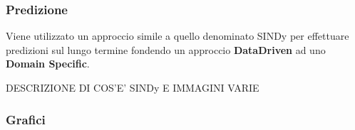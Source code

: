 \subsubsection*{Predizione}
Viene utilizzato un approccio simile a quello denominato SINDy \cite{wiki:Sparse_identification_of_non-linear_dynamics}
per effettuare predizioni sul lungo termine fondendo un approccio \textbf{DataDriven} ad uno
\textbf{Domain Specific}.  

DESCRIZIONE DI COS'E' SINDy E IMMAGINI VARIE

\subsubsection{Grafici}